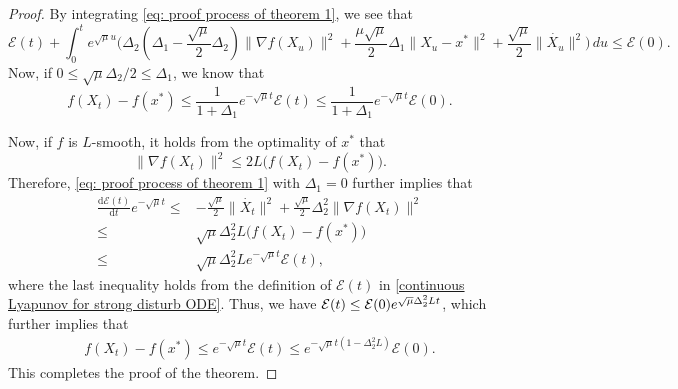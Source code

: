 \documentclass[11pt]{article}
\newcommand{\1}{\mathbf 1}
\numberwithin{equation}{section}
\begin{document}
\begin{proof}
By integrating \eqref{eq: proof process of theorem 1}, we see that
\begin{equation*}
    \mathcal{E}(t)+\int_{0}^t e^{\sqrt{\mu}u}\big(\Delta_2(\Delta_1-\frac{\sqrt{\mu}}{2}\Delta_2)\|\nabla f(X_u)\|^2 +\frac{\mu\sqrt{\mu}}{2}\Delta_1\|X_u-x^*\|^2+\frac{\sqrt{\mu}}{2}\|\dot{X_u}\|^2 \big)\,du \leqslant \mathcal{E}(0).
\end{equation*}
Now, if $0 \leqslant \sqrt{\mu}\Delta_2/ 2 \leqslant  \Delta_1$, we know that 
\begin{equation*}
    f(X_t)-f(x^*)\leqslant \frac{1}{1+\Delta_1}e^{-\sqrt{\mu}t}\mathcal{E}(t)\leqslant \frac{1}{1+\Delta_1}e^{-\sqrt{\mu}t}\mathcal{E}(0).
\end{equation*}

Now, if $f$ is $L$-smooth, it holds from the optimality of $x^*$ that 
\begin{equation*}
    \|\nabla f(X_t)\|^2 \leqslant 2L\big(f(X_t)-f(x^*)\big).
\end{equation*}
Therefore, \eqref{eq: proof process of theorem 1}  with $\Delta_1=0$ further implies that 
\begin{align*}
    \frac{\mathrm{d} \mathcal{E}(t)}{\mathrm{d} t}e^{-\sqrt{\mu}t}\leqslant & -\frac{\sqrt{\mu}}{2}\|\dot{X_t}\|^2+\frac{\sqrt{\mu}}{2}\Delta_2^2\|\nabla f(X_t)\|^2\\
    \leqslant & \sqrt{\mu}\Delta_2^2L \big(f(X_t)-f(x^*)\big)\\
    \leqslant & \sqrt{\mu}\Delta_2^2 L e^{-\sqrt{\mu}t}\mathcal{E}(t),
\end{align*}
where the last inequality holds from the definition of $\mathcal{E}(t)$ in \eqref{continuous Lyapunov for strong disturb ODE}.
Thus, we have ${\cal E}(t) \le {\cal E}(0) e^{\sqrt{\mu}\Delta_2^2 Lt}$, which further implies that 
\begin{align*}
    f(X_t)-f(x^*)\leqslant e^{-\sqrt{\mu}t}\mathcal{E}(t)\leqslant e^{-\sqrt{\mu}t(1-\Delta_2^2L)} \mathcal{E}(0).
\end{align*}
This completes the proof of the theorem.
\end{proof}
\end{document}
